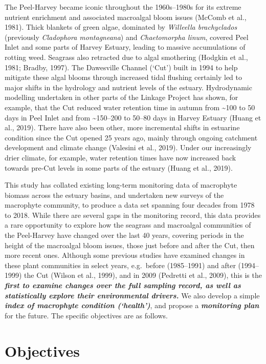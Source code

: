 \documentclass[
]{book}
\begin{document}
The Peel-Harvey became iconic throughout the 1960s--1980s for its extreme nutrient enrichment and associated macroalgal bloom issues (McComb et al., 1981). Thick blankets of green algae, dominated by \emph{Willeella brachyclados} (previously \emph{Cladophora montagneana}) and \emph{Chaetomorpha linum}, covered Peel Inlet and some parts of Harvey Estuary, leading to massive accumulations of rotting weed. Seagrass also retracted due to algal smothering (Hodgkin et al., 1981; Bradby, 1997). The Dawesville Channel (`Cut') built in 1994 to help mitigate these algal blooms through increased tidal flushing certainly led to major shifts in the hydrology and nutrient levels of the estuary. Hydrodynamic modelling undertaken in other parts of the Linkage Project has shown, for example, that the Cut reduced water retention time in autumn from \textasciitilde100 to 50 days in Peel Inlet and from \textasciitilde150--200 to 50--80 days in Harvey Estuary (Huang et al., 2019). There have also been other, more incremental shifts in estuarine condition since the Cut opened 25 years ago, mainly through ongoing catchment development and climate change (Valesini et al., 2019). Under our increasingly drier climate, for example, water retention times have now increased back towards pre-Cut levels in some parts of the estuary (Huang et al., 2019).

This study has collated existing long-term monitoring data of macrophyte biomass across the estuary basins, and undertaken new surveys of the macrophyte community, to produce a data set spanning four decades from 1978 to 2018. While there are several gaps in the monitoring record, this data provides a rare opportunity to explore how the seagrass and macroalgal communities of the Peel-Harvey have changed over the last 40 years, covering periods in the height of the macroalgal bloom issues, those just before and after the Cut, then more recent ones. Although some previous studies have examined changes in these plant communities in select years, e.g.~before (1985--1991) and after (1994--1999) the Cut (Wilson et al., 1999), and in 2009 (Pedretti et al., 2009), this is the \textbf{\emph{first to examine changes over the full sampling record, as well as statistically explore their environmental drivers.}} We also develop a simple \textbf{\emph{index of macrophyte condition (`health')}}, and propose a \textbf{\emph{monitoring plan}} for the future. The specific objectives are as follows.

\hypertarget{objectives-2}{%
\section{Objectives}\label{objectives-2}}
\end{document}
